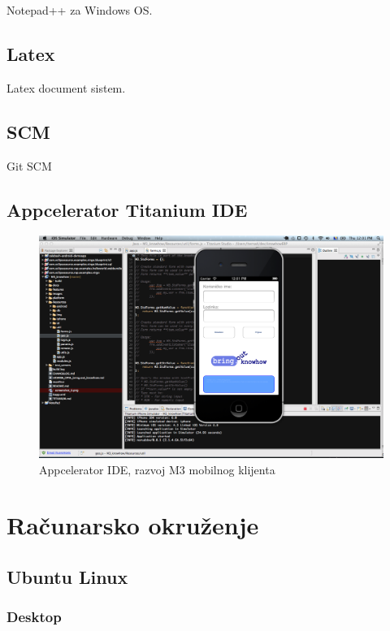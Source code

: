 \documentclass[times, utf8, seminar]{fit}
\begin{document}
Notepad++ za Windows OS.

\section{Latex}

Latex document sistem.

\section{SCM}

Git SCM

\section{Appcelerator Titanium IDE}

\begin{figure}[H]
\centering
\includegraphics[width=14cm]{img/titanium_m3.png}
\caption{Appcelerator IDE, razvoj M3 mobilnog klijenta}
\end{figure}


\chapter{Računarsko okruženje}

\section{Ubuntu Linux}

\subsection{Desktop}
\end{document}
